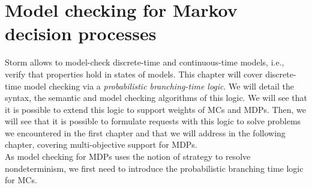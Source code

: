 \chapter{Model checking for Markov decision processes}

Storm allows to model-check discrete-time and continuous-time models, i.e.,
verify that properties hold in states of models. This
chapter will cover discrete-time model checking via a \textit{probabilistic branching-time logic}. We will detail the syntax, the semantic and model checking algorithms of this logic.
We will see that it is possible to extend this logic to support weights of MCs and MDPs. Then, we will see that it is
possible to formulate requests with this logic to solve
problems we encountered in the first chapter and that we
will address in the following chapter, covering multi-objective support for MDPs. \\

As model checking for MDPs uses the notion of strategy to resolve nondeterminism,
we first need to introduce the probabilistic branching time logic for MCs.

